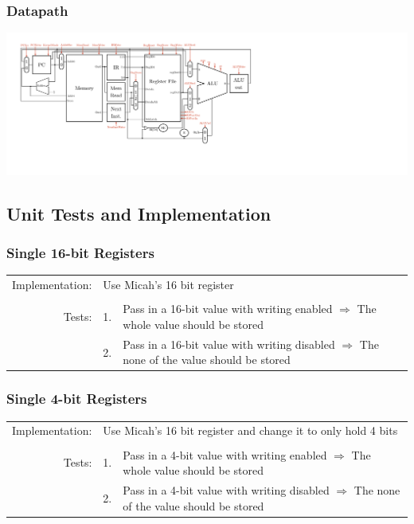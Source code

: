 \documentclass{article}
\begin{document}
\begin{landscape}
		\subsubsection{Datapath}
			\begin{center}
				\includegraphics[width=22.5cm]{datapath}
			\end{center}
		\end{landscape}
	\subsection{Unit Tests and Implementation}
		\subsubsection{Single 16-bit Registers}
			\begin{tabular}{ r  r  p{12cm} }
				Implementation: & \multicolumn{2}{l}{Use Micah's 16 bit register}\\
				                &    & \\
				         Tests: & 1. & Pass in a 16-bit value with writing enabled $\Rightarrow$ The whole value should be stored\\
				                & 2. & Pass in a 16-bit value with writing disabled $\Rightarrow$ The none of the value should be stored\\
			\end{tabular}
		\subsubsection{Single 4-bit Registers}
			\begin{tabular}{ r  r  p{12cm} }
				Implementation: & \multicolumn{2}{l}{Use Micah's 16 bit register and change it to only hold 4 bits}\\
				                &    & \\
				         Tests: & 1. & Pass in a 4-bit value with writing enabled $\Rightarrow$ The whole value should be stored\\
				                & 2. & Pass in a 4-bit value with writing disabled $\Rightarrow$ The none of the value should be stored\\
			\end{tabular}
\end{document}
